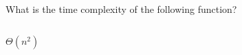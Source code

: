 \begin{prob}
    What is the time complexity of the following function?

    \inputminted{python}{./code.py}

    \begin{soln}
        $\Theta(n^2)$
    \end{soln}

\end{prob}
